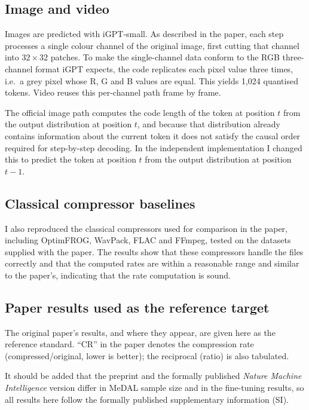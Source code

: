 \documentclass[12pt,a4paper]{article}
\begin{document}
\subsection{Image and video}

Images are predicted with iGPT-small. As described in the paper, each step processes a single
colour channel of the original image, first cutting that channel into $32\times32$ patches.
To make the single-channel data conform to the RGB three-channel format iGPT expects, the
code replicates each pixel value three times, i.e.\ a grey pixel whose R, G and B values are
equal. This yields 1{,}024 quantised tokens. Video reuses this per-channel path frame by
frame.

The official image path computes the code length of the token at position $t$ from the output
distribution at position $t$, and because that distribution already contains information about
the current token it does not satisfy the causal order required for step-by-step decoding. In
the independent implementation I changed this to predict the token at position $t$ from the
output distribution at position $t-1$.

\subsection{Classical compressor baselines}

I also reproduced the classical compressors used for comparison in the paper, including
OptimFROG, WavPack, FLAC and FFmpeg, tested on the datasets supplied with the paper. The
results show that these compressors handle the files correctly and that the computed rates are
within a reasonable range and similar to the paper's, indicating that the rate computation is
sound.

\subsection{Paper results used as the reference target}

The original paper's results, and where they appear, are given here as the reference
standard. ``CR'' in the paper denotes the compression rate (compressed/original, lower is
better); the reciprocal (ratio) is also tabulated.

It should be added that the preprint and the formally published \emph{Nature Machine
Intelligence} version differ in MeDAL sample size and in the fine-tuning results, so all
results here follow the formally published supplementary information (SI).
\end{document}
